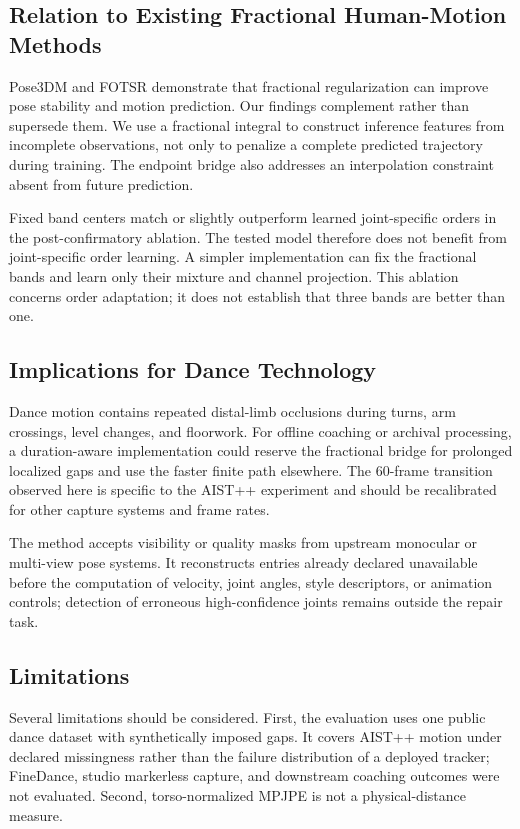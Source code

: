 \documentclass[fractalfract,article,submit,moreauthors,pdftex]{Definitions/mdpi}
\begin{document}
\subsection{Relation to Existing Fractional Human-Motion Methods}

Pose3DM \cite{wang2025pose3dm} and FOTSR \cite{guo2026fotsr} demonstrate that fractional regularization can improve pose stability and motion prediction. Our findings complement rather than supersede them. We use a fractional integral to construct inference features from incomplete observations, not only to penalize a complete predicted trajectory during training. The endpoint bridge also addresses an interpolation constraint absent from future prediction.

Fixed band centers match or slightly outperform learned joint-specific orders in the post-confirmatory ablation. The tested model therefore does not benefit from joint-specific order learning. A simpler implementation can fix the fractional bands and learn only their mixture and channel projection. This ablation concerns order adaptation; it does not establish that three bands are better than one.

\subsection{Implications for Dance Technology}

Dance motion contains repeated distal-limb occlusions during turns, arm crossings, level changes, and floorwork. For offline coaching or archival processing, a duration-aware implementation could reserve the fractional bridge for prolonged localized gaps and use the faster finite path elsewhere. The 60-frame transition observed here is specific to the AIST++ experiment and should be recalibrated for other capture systems and frame rates.

The method accepts visibility or quality masks from upstream monocular or multi-view pose systems. It reconstructs entries already declared unavailable before the computation of velocity, joint angles, style descriptors, or animation controls; detection of erroneous high-confidence joints remains outside the repair task.

\subsection{Limitations}

Several limitations should be considered. First, the evaluation uses one public dance dataset with synthetically imposed gaps. It covers AIST++ motion under declared missingness rather than the failure distribution of a deployed tracker; FineDance, studio markerless capture, and downstream coaching outcomes were not evaluated. Second, torso-normalized MPJPE is not a physical-distance measure.
\end{document}

